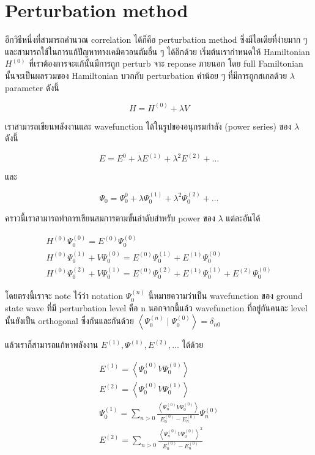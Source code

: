\section{Perturbation method}

อีกวิธีหนึ่งที่สามารถคำนวณ correlation ได้ก็คือ perturbation method ซึ่งมีไอเดียที่ง่ายมาก ๆ
และสามารถใช้ในการแก้ปัญหาทางเคมีควอนตัมอื่น ๆ ได้อีกด้วย เริ่มต้นเรากำหนดให้ Hamiltonian
$H^{(0)}$ ที่เราต้องการจะแก้นั้นมีการถูก perturb จาะ reponse ภายนอก โดย full
Familtonian นั้นจะเป็นผลรวมของ Hamiltonian บวกกับ perturbation ค่าน้อย ๆ
ที่มีการถูกสเกลด้วย $\lambda$ parameter ดังนี้

\begin{equation}
    H = H^{(0)} + \lambda V
\end{equation}

เราสามารถเขียนพลังงานและ wavefunction ได้ในรูปของอนุกรมกำลัง (power series)
ของ $\lambda$ ดังนี้

\begin{equation}
    E = E^{0} + \lambda E^{(1)} + \lambda^{2} E^{(2)} + \dots
\end{equation}

\noindent และ

\begin{equation}
    \Psi_{0} = \Psi_{0}^{0} + \lambda \Psi_{0}^{(1)}
    + \lambda^{2} \Psi_{0}^{(2)} + \dots
\end{equation}

คราวนี้เราสามารถทำการเขียนสมการตามขั้นลำดับสำหรับ power ของ $\lambda$ แต่ละอันได้

\begin{gather}
    H^{(0)} \Psi_0^{(0)} = E^{(0)} \Psi_0^{(0)} \\
    H^{(0)} \Psi_0^{(1)}+V \Psi_0^{(0)}
    = E^{(0)} \Psi_0^{(1)}+E^{(1)} \Psi_0^{(0)} \\
    H^{(0)} \Psi_0^{(2)}+V \Psi_0^{(1)}
    = E^{(0)} \Psi_0^{(2)}+E^{(1)} \Psi_0^{(1)}+E^{(2)} \Psi_0^{(0)}
\end{gather}

โดยตรงนี้เราจะ note ไว้ว่า notation $\Psi_0^{(n)}$ นี้หมายความว่าเป็น wavefunction
ของ ground state wave ที่มี perturbation level คือ $\mathrm{n}$
นอกจากนี้แล้ว wavefunction ที่อยู่กันคนละ level นั้นยังเป็น orthogonal ซึ่งกันและกันด้วย
$\left\langle\Psi_0^{(n)} \mid \Psi_0^{(0)}\right\rangle = \delta_{n 0}$

แล้วเราก็สามารถแก้หาพลังงาน $E^{(1)}, \Psi^{(1)}, E^{(2)}, \dots$ ได้ด้วย

\begin{gather}
    E^{(1)} = \left\langle\Psi_0^{(0)} V \Psi_0^{(0)}\right\rangle \\
    E^{(2)} = \left\langle\Psi_0^{(0)} V \Psi_0^{(1)}\right\rangle \\
    \Psi_0^{(1)} = \sum_{n>0} \frac{\left\langle\Psi_n^{(0)} V \Psi_0^{(0)}\right\rangle}
    {E_0^{(0)}-E_n^{(0)}} \Psi_n^{(0)} \\
    E^{(2)} = \sum_{n>0} \frac{\left\langle\Psi_n^{(0)} V \Psi_0^{(0)}\right\rangle^2}
    {E_0^{(0)}-E_n^{(0)}}
\end{gather}

